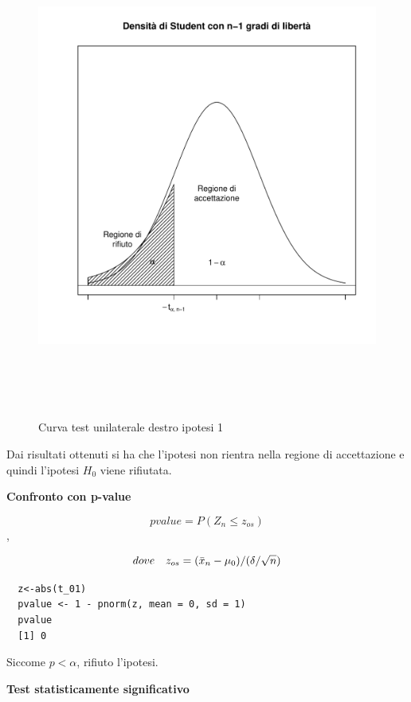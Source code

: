 \begin{figure}[!htb]
    \centering
    \includegraphics[height=16cm]{capitoli/images/3_verifica_ipotesi/curvehp5.pdf}
    \caption{Curva test unilaterale destro ipotesi 1}
\end{figure}

Dai risultati ottenuti si ha che l'ipotesi non rientra nella regione di accettazione e quindi l'ipotesi $H_0$ viene rifiutata.

\vspace{5mm}
\noindent \textbf{Confronto con p-value}

\[pvalue = P(Z_n \leq z_{os})\],

\[dove \quad z_{os} = (\Bar{x}_n - \mu_0)/(\delta/\sqrt{n})\]

\vspace{5mm}
\begin{lstlisting}
  z<-abs(t_01)
  pvalue <- 1 - pnorm(z, mean = 0, sd = 1)
  pvalue
  [1] 0
\end{lstlisting}

Siccome $p < \alpha$, rifiuto l'ipotesi.

\vspace{5mm}
\noindent \textbf{Test statisticamente significativo}

